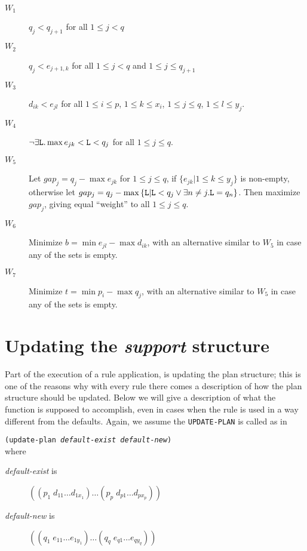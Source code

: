 \begin{description}
\item [$W_{1}$ ]  $q_j < q_{j+1}$ for all $1 \leq j < q$

\item [$W_{2}$ ]  $q_j < e_{j+1,k}$ for all $1 \leq j < q$ and 
$1 \leq j \leq q_{j+1}$

\item [$W_{3}$ ]  $d_{ik} < e_{jl}$ for all $1\leq i \leq p$,
$1\leq k \leq x_i$, $1\leq j \leq q$, $1\leq l \leq y_j$.

\item [$W_{4}$ ]  $\lnot\exists {\tt L}. \max{e_{jk}} < {\tt L} < q_j$ for
all $1 \leq j \leq q$.

\item [$W_{5}$ ]  Let $gap_{j} = q_j - \max{e_{jk}}$ for $1 \leq j \leq q$, if
$\{e_{jk} | 1 \leq k \leq y_j\}$ is non-empty, otherwise let $gap_{j} =
q_j - \max{\{{\tt L} | {\tt L} < q_j \lor \exists n\neq j . {\tt L} = q_n\}}$.
Then maximize $gap_{j}$, giving equal ``weight'' to all $1\leq j \leq q$.

\item [$W_{6}$ ]  Minimize $b = \min{e_{jl}} - \max{d_{ik}}$, with an alternative
similar to $W_{5}$ in case any of the sets is empty.

\item [$W_{7}$ ]  Minimize $t = \min{p_i} - \max{q_j}$, with an alternative similar
to $W_{5}$ in case any of the sets is empty.
\end{description}


\section{Updating the {\it support} structure}

Part of the execution of a rule application, is updating the plan
structure; this is one of the reasons why with every rule there 
comes a description of how the plan structure should be updated.
Below we will give a description of what the
function  is supposed to accomplish, even in cases
when the rule is used in a way different from the defaults.  Again,
we assume the {\tt UPDATE-PLAN} is called as in 

{\tt (update-plan {\it default-exist} {\it default-new})} \\
where

\begin{description}
\item [{\it default-exist} is ]  $((p_1\; d_{11} \ldots d_{1x_1})\ldots (p_p\; d_{p1}\ldots d_{px_p}))$

\item [{\it default-new} is ]  $((q_1\; e_{11} \ldots e_{1y_1})\ldots (q_q\; e_{q1}\ldots e_{qy_q}))$
\end{description}

